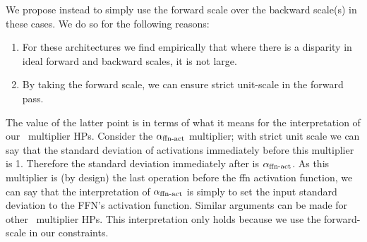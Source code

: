 We propose instead to simply use the forward scale over the backward scale(s) in these cases. We do so for the following reasons:
\begin{enumerate}
    \item For these architectures we find empirically that where there is a disparity in ideal forward and backward scales, it is not large.
    \item By taking the forward scale, we can ensure strict unit-scale in the forward pass.
\end{enumerate}
The value of the latter point is in terms of what it means for the interpretation of our \umup\ multiplier HPs. Consider the $\alpha_{\mathrm{ffn{\text -}act}}$ multiplier; with strict unit scale we can say that the standard deviation of activations immediately before this multiplier is 1. Therefore the standard deviation immediately after is $\alpha_{\mathrm{ffn{\text -}act}}$. As this multiplier is (by design) the last operation before the ffn activation function, we can say that the interpretation of $\alpha_{\mathrm{ffn{\text -}act}}$ is simply to set the input standard deviation to the FFN's activation function.
Similar arguments can be made for other \umup\ multiplier HPs. This interpretation only holds because we use the forward-scale in our constraints.
